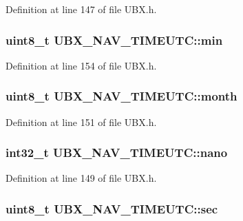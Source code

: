 \-Definition at line 147 of file \-U\-B\-X.\-h.

\hypertarget{struct_u_b_x___n_a_v___t_i_m_e_u_t_c_acd6195ae28168d6d82b8944dd362a976}{
\subsubsection[{min}]{\setlength{\rightskip}{0pt plus 5cm}uint8\-\_\-t {\bf \-U\-B\-X\-\_\-\-N\-A\-V\-\_\-\-T\-I\-M\-E\-U\-T\-C\-::min}}}\label{struct_u_b_x___n_a_v___t_i_m_e_u_t_c_acd6195ae28168d6d82b8944dd362a976}


\-Definition at line 154 of file \-U\-B\-X.\-h.

\hypertarget{struct_u_b_x___n_a_v___t_i_m_e_u_t_c_afd4af98336281bae2375714238392070}{
\subsubsection[{month}]{\setlength{\rightskip}{0pt plus 5cm}uint8\-\_\-t {\bf \-U\-B\-X\-\_\-\-N\-A\-V\-\_\-\-T\-I\-M\-E\-U\-T\-C\-::month}}}\label{struct_u_b_x___n_a_v___t_i_m_e_u_t_c_afd4af98336281bae2375714238392070}


\-Definition at line 151 of file \-U\-B\-X.\-h.

\hypertarget{struct_u_b_x___n_a_v___t_i_m_e_u_t_c_a2d187aede7b05688f29eacfd6bd57ecc}{
\subsubsection[{nano}]{\setlength{\rightskip}{0pt plus 5cm}int32\-\_\-t {\bf \-U\-B\-X\-\_\-\-N\-A\-V\-\_\-\-T\-I\-M\-E\-U\-T\-C\-::nano}}}\label{struct_u_b_x___n_a_v___t_i_m_e_u_t_c_a2d187aede7b05688f29eacfd6bd57ecc}


\-Definition at line 149 of file \-U\-B\-X.\-h.

\hypertarget{struct_u_b_x___n_a_v___t_i_m_e_u_t_c_adf8744b17bc7095cc06d9f0909bd865d}{
\subsubsection[{sec}]{\setlength{\rightskip}{0pt plus 5cm}uint8\-\_\-t {\bf \-U\-B\-X\-\_\-\-N\-A\-V\-\_\-\-T\-I\-M\-E\-U\-T\-C\-::sec}}}\label{struct_u_b_x___n_a_v___t_i_m_e_u_t_c_adf8744b17bc7095cc06d9f0909bd865d}


